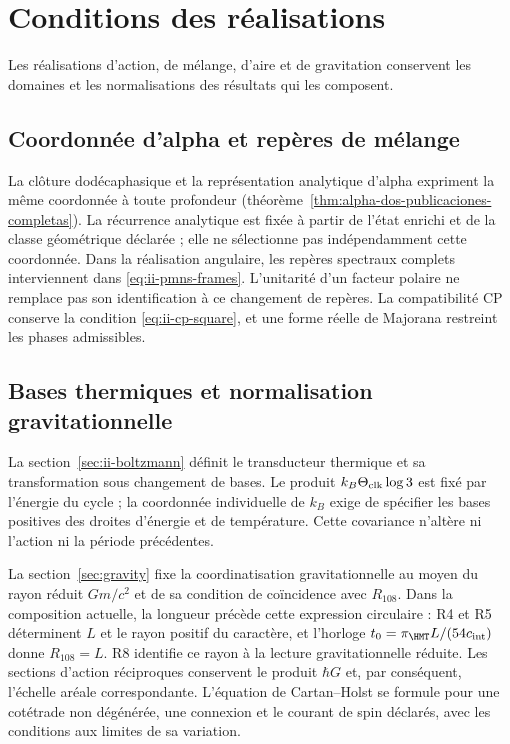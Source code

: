 \section{Conditions des réalisations}
\label{sec:ii-condiciones-realizaciones}

Les réalisations d’action, de mélange, d’aire et de gravitation conservent
les domaines et les normalisations des résultats qui les composent.

\subsection{Coordonnée d’alpha et repères de mélange}

La clôture dodécaphasique et la représentation analytique d’alpha expriment
la même coordonnée à toute profondeur
(théorème~\ref{thm:alpha-dos-publicaciones-completas}).
La récurrence analytique est fixée à partir de l’état enrichi et de la classe
géométrique déclarée ; elle ne sélectionne pas indépendamment cette coordonnée.
Dans la réalisation angulaire, les repères spectraux complets interviennent
dans \eqref{eq:ii-pmns-frames}. L’unitarité d’un facteur polaire ne remplace pas
son identification à ce changement de repères. La compatibilité CP conserve
la condition \eqref{eq:ii-cp-square}, et une forme réelle de Majorana restreint
les phases admissibles.

\subsection{Bases thermiques et normalisation gravitationnelle}

La section~\ref{sec:ii-boltzmann} définit le transducteur thermique et sa
transformation sous changement de bases. Le produit
\(k_B\Theta_{\rm clk}\log3\) est fixé par l’énergie du cycle ;
la coordonnée individuelle de \(k_B\) exige de spécifier les bases positives
des droites d’énergie et de température. Cette covariance n’altère
ni l’action ni la période précédentes.

La section~\ref{sec:gravity} fixe la coordinatisation gravitationnelle au moyen du rayon
réduit \(Gm/c^2\) et de sa condition de coïncidence avec \(R_{108}\).
Dans la composition actuelle, la longueur précède cette expression circulaire :
R4 et R5 déterminent \(L\) et le rayon positif du caractère, et l’horloge
\(t_0=\pi_{\HMT}L/(54c_{\rm int})\) donne \(R_{108}=L\).
R8 identifie ce rayon à la lecture gravitationnelle réduite.
Les sections d’action réciproques conservent le produit \(\hbar G\)
et, par conséquent, l’échelle aréale correspondante. L’équation de Cartan--Holst
se formule pour une cotétrade non dégénérée, une connexion et le courant
de spin déclarés, avec les conditions aux limites de sa variation.

